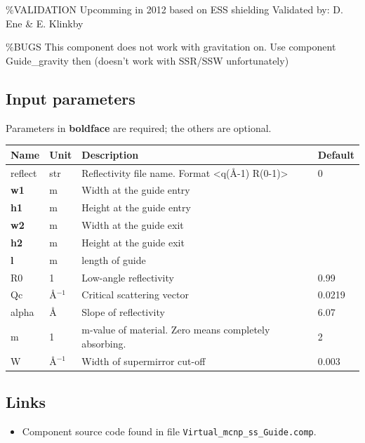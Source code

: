 \%VALIDATION Upcomming in 2012 based on ESS shielding Validated by: D. Ene \& E. Klinkby

\%BUGS This component does not work with gravitation on. Use component Guide\_gravity then (doesn't work with SSR/SSW unfortunately)

\subsection*{Input parameters}
Parameters in \textbf{boldface} are required; the others are optional.

\begin{longtable}{p{}p{}p{}p{}}
\toprule
\textbf{Name} & \textbf{Unit} & \textbf{Description} & \textbf{Default} \\
\midrule
\endhead
reflect & str & Reflectivity file name. Format \textless{}q(\AA{}-1) R(0-1)\textgreater{} & 0 \\
\textbf{w1} & m & Width at the guide entry &  \\
\textbf{h1} & m & Height at the guide entry &  \\
\textbf{w2} & m & Width at the guide exit &  \\
\textbf{h2} & m & Height at the guide exit &  \\
\textbf{l} & m & length of guide &  \\
R0 & 1 & Low-angle reflectivity & 0.99 \\
Qc & \AA{}$^{-1}$ & Critical scattering vector & 0.0219 \\
alpha & \AA{} & Slope of reflectivity & 6.07 \\
m & 1 & m-value of material. Zero means completely absorbing. & 2 \\
W & \AA{}$^{-1}$ & Width of supermirror cut-off & 0.003 \\
\bottomrule
\end{longtable}

\subsection*{Links}
\begin{itemize}
  \item Component source code found in file \texttt{Virtual\_mcnp\_ss\_Guide.comp}.
\end{itemize}
